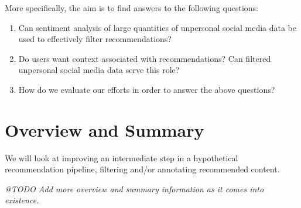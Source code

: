 More specifically, the aim is to find answers to the following questions:

\begin{enumerate}
  \item Can sentiment analysis of large quantities of unpersonal social media data be used to effectively filter recommendations?
  \item Do users want context associated with recommendations? Can filtered unpersonal social media data serve this role?
  \item How do we evaluate our efforts in order to answer the above questions?
\end{enumerate}


\section{Overview and Summary}

We will look at improving an intermediate step in a hypothetical recommendation pipeline, filtering and/or annotating recommended content.

\emph{@TODO Add more overview and summary information as it comes into existence.}


